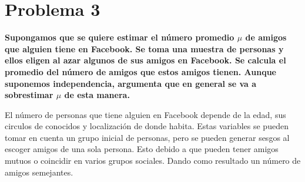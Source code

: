 \section*{Problema 3}

\textbf{Supongamos que se quiere estimar el número promedio
    $\mu$ de amigos que alguien tiene en Facebook. Se toma una muestra de
    personas y ellos eligen al azar algunos de sus amigos en Facebook. Se
    calcula el promedio del número de amigos que estos amigos tienen. Aunque
    suponemos independencia, argumenta que en general se va a sobrestimar
    $\mu$ de esta manera.}

El número de personas que tiene alguien en Facebook depende de la edad, sus circulos de conocidos y localización de donde habita. Estas variables se pueden tomar en cuenta un grupo inicial de personas, pero se pueden generar sesgos al escoger amigos de una sola persona. Esto debido a que pueden tener amigos mutuos o coincidir en varios grupos sociales. Dando como resultado un número de amigos semejantes.